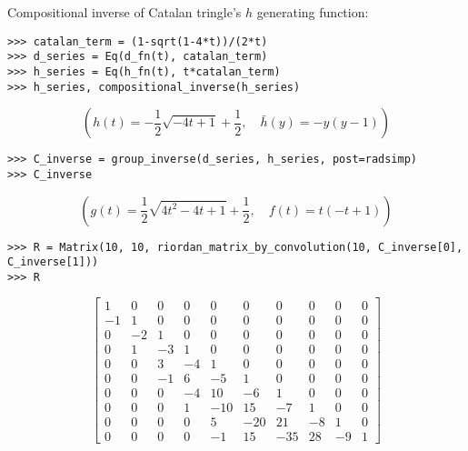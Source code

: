 \begin{example}
Compositional inverse of Catalan tringle's $h$ generating function:
\begin{verbatim}
>>> catalan_term = (1-sqrt(1-4*t))/(2*t)
>>> d_series = Eq(d_fn(t), catalan_term)
>>> h_series = Eq(h_fn(t), t*catalan_term)
>>> h_series, compositional_inverse(h_series)
\end{verbatim}
\begin{displaymath}
\left ( h{\left (t \right )} = - \frac{1}{2} \sqrt{- 4 t + 1} + \frac{1}{2}, \quad \bar{ h }{\left (y \right )} = - y \left(y - 1\right)\right )
\end{displaymath}
\begin{verbatim}
>>> C_inverse = group_inverse(d_series, h_series, post=radsimp)
>>> C_inverse
\end{verbatim}
\begin{displaymath}
\left ( g{\left (t \right )} = \frac{1}{2} \sqrt{4 t^{2} - 4 t + 1} + \frac{1}{2}, \quad f{\left (t \right )} = t \left(- t + 1\right)\right )
\end{displaymath}
\begin{verbatim}
>>> R = Matrix(10, 10, riordan_matrix_by_convolution(10, C_inverse[0], C_inverse[1]))
>>> R
\end{verbatim}
\begin{displaymath}
\left[\begin{matrix}1 & 0 & 0 & 0 & 0 & 0 & 0 & 0 & 0 & 0\\-1 & 1 & 0 & 0 & 0 & 0 & 0 & 0 & 0 & 0\\0 & -2 & 1 & 0 & 0 & 0 & 0 & 0 & 0 & 0\\0 & 1 & -3 & 1 & 0 & 0 & 0 & 0 & 0 & 0\\0 & 0 & 3 & -4 & 1 & 0 & 0 & 0 & 0 & 0\\0 & 0 & -1 & 6 & -5 & 1 & 0 & 0 & 0 & 0\\0 & 0 & 0 & -4 & 10 & -6 & 1 & 0 & 0 & 0\\0 & 0 & 0 & 1 & -10 & 15 & -7 & 1 & 0 & 0\\0 & 0 & 0 & 0 & 5 & -20 & 21 & -8 & 1 & 0\\0 & 0 & 0 & 0 & -1 & 15 & -35 & 28 & -9 & 1\end{matrix}\right]
\end{displaymath}
\end{example}
